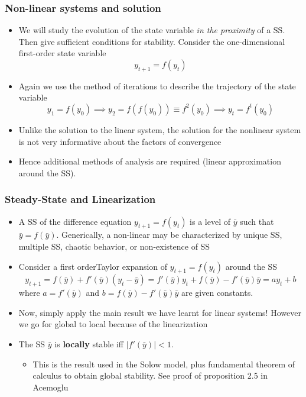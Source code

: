 \documentclass[11pt]{beamer}
\begin{document}
\begin{frame}
\frametitle{Non-linear systems and solution}
\begin{itemize}\itemsep2ex
	\item We will study the evolution of the state variable \textit{in the proximity} of a SS. Then give sufficient conditions for stability. Consider the one-dimensional first-order state variable
	\begin{equation*}
	y_{t+1} =f (y_t)
	\end{equation*}
	\item Again we use the method of iterations to describe the trajectory of the state variable
	\begin{equation*}
	y_{1} =f (y_0) \implies y_{2} =f (f(y_0)) \equiv f^2(y_0) \implies y_t = f^t(y_0)
	\end{equation*}
	\item Unlike the solution to the linear system, the solution for the nonlinear system is not very informative about the factors of convergence
	\item Hence additional methods of analysis are required (linear approximation around the SS).
\end{itemize}
\end{frame}


\begin{frame}
\frametitle{Steady-State and Linearization}
\begin{itemize}\itemsep2ex
	\item A SS of the difference equation $y_{t+1} =f (y_t) $ is a level of $\bar{y}$ such that $\bar{y} = f(\bar{y})$.  Generically, a non-linear may be characterized by unique SS, multiple SS, chaotic behavior, or non-existence of SS
	\item Consider a first orderTaylor expansion of $y_{t+1}=f (y_t)$ around the SS
	\begin{equation*}
	y_{t+1} =f (\bar{y}) + f'(\bar{y}) (y_t - \bar{y}) = f'(\bar{y}) y_t + f (\bar{y}) - f'(\bar{y}) \bar{y} = ay_t + b
	\end{equation*}
where $a=f'(\bar{y})$ and $b=f (\bar{y}) - f'(\bar{y}) \bar{y}$ are given constants.
	\item Now, simply apply the main result we have learnt for linear systems! However we go for global to local because of the linearization
	\item The SS $\bar{y}$ is \textbf{locally} stable iff $|f'(\bar{y})|<1$.
	\begin{itemize}\itemsep2ex
		\item This is the result used in the Solow model, plus fundamental theorem of calculus to obtain global stability. See proof of proposition 2.5 in Acemoglu
	\end{itemize}
\end{itemize}
\end{frame}
\end{document}
